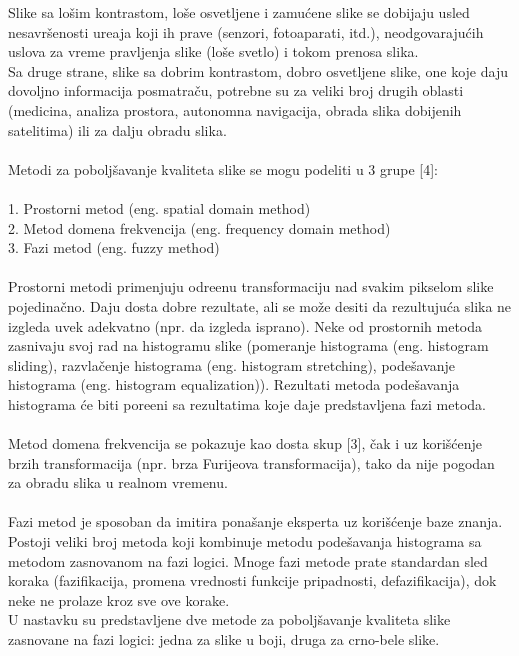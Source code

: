 \documentclass[12pt,a4paper]{article}
\theoremstyle{definition}
\theoremstyle{remark}
\theoremstyle{plain}
\begin{document}
Slike sa lo\v sim kontrastom, lo\v se osvetljene i zamu\' cene slike se dobijaju usled nesavr\v senosti ure\dj aja koji ih prave (senzori, fotoaparati, itd.), neodgovaraju\' cih uslova za vreme pravljenja slike (lo\v se svetlo) i tokom prenosa slika.
\\
Sa druge strane, slike sa dobrim kontrastom, dobro osvetljene slike, one koje daju dovoljno informacija posmatra\v cu, potrebne su za veliki broj drugih oblasti (medicina, analiza prostora, autonomna navigacija, obrada slika dobijenih satelitima) ili za dalju obradu slika.
\\ \\
Metodi za pobolj\v savanje kvaliteta slike se mogu podeliti u 3 grupe [4]:
\\
\\1. Prostorni metod (eng. spatial domain method)
\\2. Metod domena frekvencija (eng. frequency domain method)
\\3. Fazi metod (eng. fuzzy method)
\\ \\ 
Prostorni metodi primenjuju odre\dj enu transformaciju nad svakim pikselom slike pojedina\v cno. Daju dosta dobre rezultate, ali se mo\v ze desiti da rezultuju\' ca slika ne izgleda uvek adekvatno (npr. da izgleda isprano).
Neke od prostornih metoda zasnivaju svoj rad na histogramu slike (pomeranje histograma (eng. histogram sliding), razvla\v cenje histograma (eng. histogram stretching), pode\v savanje histograma (eng. histogram equalization)).
Rezultati metoda pode\v savanja histograma \' ce biti pore\dj eni sa rezultatima koje daje predstavljena fazi metoda.
\\ \\ 
Metod domena frekvencija se pokazuje kao dosta skup [3], \v cak i uz kori\v s\' cenje brzih transformacija (npr. brza Furijeova transformacija), tako da nije pogodan za obradu slika u realnom vremenu.
\\ \\ 
Fazi metod je sposoban da imitira pona\v sanje eksperta uz kori\v s\' cenje baze znanja.\\
Postoji veliki broj metoda koji kombinuje metodu pode\v savanja histograma sa metodom zasnovanom na fazi logici.
Mnoge fazi metode prate standardan sled koraka (fazifikacija, promena vrednosti funkcije pripadnosti, defazifikacija), dok neke ne prolaze kroz sve ove korake.\\

U nastavku su predstavljene dve metode za pobolj\v savanje kvaliteta slike zasnovane na fazi logici: jedna za slike u boji, druga za crno-bele slike.
\end{document}
